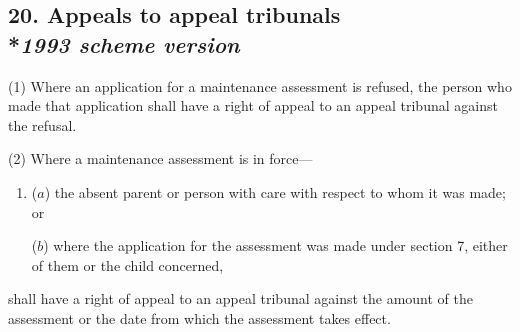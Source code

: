 \documentclass[12pt,a4paper]{article}
\begin{document}
%
%
%
%
%
%
%
%
%
%
%
%
%
%

\subsection[20. Appeals to appeal tribunals --- \emph{1993 scheme version}]{20. Appeals to appeal tribunals\\*\emph{1993 scheme version}}

(1) Where an application for a maintenance assessment is refused, the person who made that application shall have a right of appeal to an appeal tribunal against the refusal.

(2) Where a maintenance assessment is in force—
\begin{enumerate}\item[]
($a$) the absent parent or person with care with respect to whom it was made; or

($b$) where the application for the assessment was made under section 7, either of them or the child concerned,
\end{enumerate}
shall have a right of appeal to an appeal tribunal against the amount of the assessment or the date from which the assessment takes effect.
\end{document}
